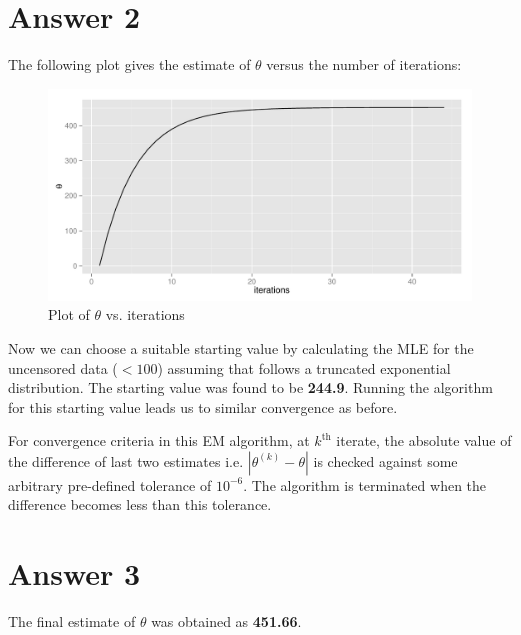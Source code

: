 \documentclass[12pt]{article}
\begin{document}
\section*{Answer 2}
The following plot gives the estimate of $\theta$ versus the number of iterations:
\begin{figure}[H]
\begin{centering}
\includegraphics{aua257HW4-001}
\caption{Plot of $\theta$ vs. iterations}
\end{centering}
\end{figure}

Now we can choose a suitable starting value by calculating the MLE for the uncensored data ($<100$) assuming that follows a truncated exponential distribution. The starting value was found to be \textbf{244.9}. Running the algorithm for this starting value leads us to similar convergence as before.

For convergence criteria in this EM algorithm, at $k^{\text{th}}$ iterate, the absolute value of the difference of last two estimates i.e. $|\theta^{(k)}-\theta|$ is checked against some arbitrary pre-defined tolerance of $10^{-6}$. The algorithm is terminated when the difference becomes less than this tolerance.

\section*{Answer 3}
The final estimate of $\theta$ was obtained as \textbf{451.66}.

\end{document}
